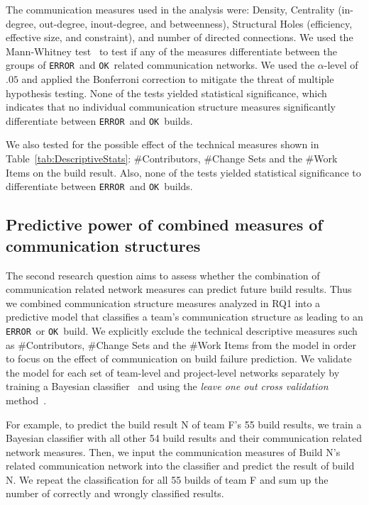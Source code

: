 \documentclass[12pt,oneside]{book}
\newcommand\error{\texttt{ERROR}}
\newcommand\ok{\texttt{OK}}
\begin{document}
The communication measures used in the analysis were: Density, Centrality
(in-degree, out-degree, inout-degree, and betweenness), Structural Holes
(efficiency, effective size, and constraint), and number of directed connections.
We used the Mann-Whitney test~\cite{Siegel:1956tu} to test if any of the measures
differentiate between the groups of \error\ and \ok\ related communication
networks. We used the $\alpha$-level of $.05$ and applied the Bonferroni
correction to mitigate the threat of multiple hypothesis testing. None of the
tests yielded statistical significance, which indicates that no individual
communication structure measures significantly differentiate between \error\ and
\ok\ builds.

We also tested for the possible effect of the technical measures shown in
Table~\ref{tab:DescriptiveStats}: \#Contributors, \#Change Sets and the \#Work
Items on the build result. Also, none of the tests yielded statistical
significance to differentiate between \error\ and \ok\ builds.


\subsection{Predictive power of combined measures of communication structures}

The second research question aims to assess whether the combination of
communication related network measures can predict future build results. Thus we
combined communication structure measures analyzed in RQ1 into a predictive model
that classifies a team's communication structure as leading to an \error\ or \ok\
build. We explicitly exclude the technical descriptive measures such as
\#Contributors, \#Change Sets and the \#Work Items from the model in order to
focus on the effect of communication on build failure prediction. We validate the
model for each set of team-level and project-level networks separately by
training a Bayesian classifier~\cite{Hastie:2003ys} and using the \emph{leave one
out cross validation} method~\cite{Hastie:2003ys}.

For example, to predict the build result N of team F's 55 build results, we train
a Bayesian classifier with all other 54 build results and their communication
related network measures. Then, we input the communication measures of Build N's
related communication network into the classifier and predict the result of build
N. We repeat the classification for all 55 builds of team F and sum up the number
of correctly and wrongly classified results.
\end{document}
